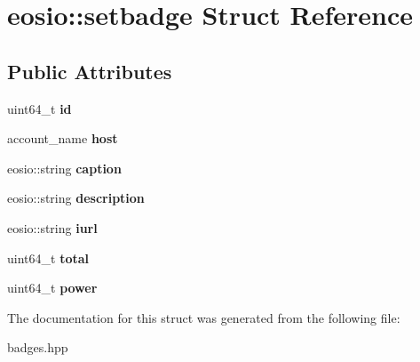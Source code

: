 \hypertarget{structeosio_1_1setbadge}{}\section{eosio\+:\+:setbadge Struct Reference}
\label{structeosio_1_1setbadge}
\subsection*{Public Attributes}
\begin{DoxyCompactItemize}
\item 
\mbox{\label{structeosio_1_1setbadge_a5128400d9eee4b9f59bb01d9b60f8357}} 
uint64\+\_\+t {\bfseries id}
\item 
\mbox{\label{structeosio_1_1setbadge_a755302157563cbc0cce6294f9b0753a1}} 
account\+\_\+name {\bfseries host}
\item 
\mbox{\label{structeosio_1_1setbadge_aa084c4f2d8219c6eb9da6e35739f3142}} 
eosio\+::string {\bfseries caption}
\item 
\mbox{\label{structeosio_1_1setbadge_aaea637cf57291c1b3dcca8ff5f2e0f90}} 
eosio\+::string {\bfseries description}
\item 
\mbox{\label{structeosio_1_1setbadge_a09e49c49fae9aab5b344f899635e0d7d}} 
eosio\+::string {\bfseries iurl}
\item 
\mbox{\label{structeosio_1_1setbadge_a4b8b662f9fcc8b92e876f4f1dea43617}} 
uint64\+\_\+t {\bfseries total}
\item 
\mbox{\label{structeosio_1_1setbadge_aaf072778cf6b9f1eca301fc6074891cf}} 
uint64\+\_\+t {\bfseries power}
\end{DoxyCompactItemize}


The documentation for this struct was generated from the following file\+:\begin{DoxyCompactItemize}
\item 
badges.\+hpp\end{DoxyCompactItemize}
